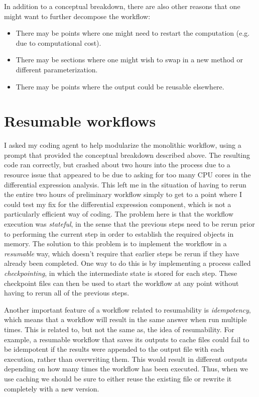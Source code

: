 In addition to a conceptual breakdown, there are also other reasons that one might want to further decompose the workflow:

\begin{itemize}
\item There may be points where one might need to restart the computation (e.g. due to computational cost).
\item There may be sections where one might wish to swap in a new method or different parameterization.
\item There may be points where the output could be reusable elsewhere.
\end{itemize}

\section{Resumable workflows}

I asked my coding agent to help modularize the monolithic workflow, using a prompt that provided the conceptual breakdown described above.  The resulting code ran correctly, but crashed about two hours into the process due to a resource issue that appeared to be due to asking for too many CPU cores in the differential expression analysis.  This left me in the situation of having to rerun the entire two hours of preliminary workflow simply to get to a point where I could test my fix for the differential expression component, which is not a particularly efficient way of coding.  The problem here is that the workflow execution was \textit{stateful}, in the sense that the previous steps need to be rerun prior to performing the current step in order to establish the required objects in memory.  The solution to this problem is to implement the workflow in a \textit{resumable} way, which doesn't require that earlier steps be rerun if they have already been completed.  One way to do this is by implementing a process called \textit{checkpointing}, in which the intermediate state is stored for each step.  These checkpoint files can then be used to start the workflow at any point without having to rerun all of the previous steps.

Another important feature of a workflow related to resumability is \textit{idempotency}, which means that a workflow will result in the same answer when run multiple times.  This is related to, but not the same as, the idea of resumability.  For example, a resumable workflow that saves its outputs to cache files could fail to be idempotent if the results were appended to the output file with each execution, rather than overwriting them.  This would result in different outputs depending on how many times the workflow has been executed.  Thus, when we use caching we should be sure to either reuse the existing file or rewrite it completely with a new version.

